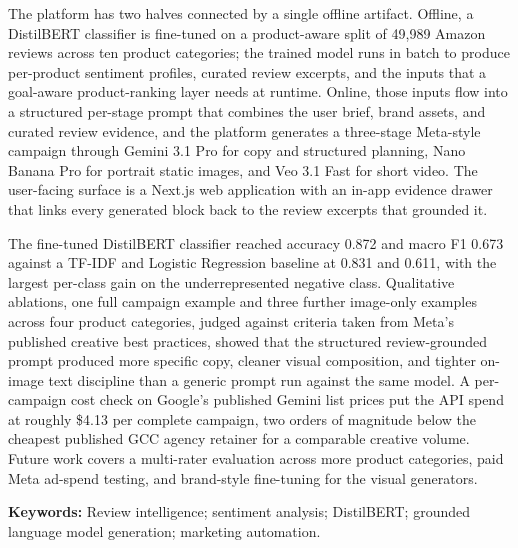 \documentclass[12pt,a4paper]{report}
\begin{document}
The platform has two halves connected by a single offline artifact. Offline, a DistilBERT classifier is fine-tuned on a product-aware split of 49,989 Amazon reviews across ten product categories; the trained model runs in batch to produce per-product sentiment profiles, curated review excerpts, and the inputs that a goal-aware product-ranking layer needs at runtime. Online, those inputs flow into a structured per-stage prompt that combines the user brief, brand assets, and curated review evidence, and the platform generates a three-stage Meta-style campaign through Gemini 3.1 Pro for copy and structured planning, Nano Banana Pro for portrait static images, and Veo 3.1 Fast for short video. The user-facing surface is a Next.js web application with an in-app evidence drawer that links every generated block back to the review excerpts that grounded it.

The fine-tuned DistilBERT classifier reached accuracy 0.872 and macro F1 0.673 against a TF-IDF and Logistic Regression baseline at 0.831 and 0.611, with the largest per-class gain on the underrepresented negative class. Qualitative ablations, one full campaign example and three further image-only examples across four product categories, judged against criteria taken from Meta's published creative best practices, showed that the structured review-grounded prompt produced more specific copy, cleaner visual composition, and tighter on-image text discipline than a generic prompt run against the same model. A per-campaign cost check on Google's published Gemini list prices put the API spend at roughly \$4.13 per complete campaign, two orders of magnitude below the cheapest published GCC agency retainer for a comparable creative volume. Future work covers a multi-rater evaluation across more product categories, paid Meta ad-spend testing, and brand-style fine-tuning for the visual generators.

\vspace{0.5cm}
\noindent\textbf{Keywords:} Review intelligence; sentiment analysis; DistilBERT; grounded language model generation; marketing automation.


\newpage
\tableofcontents

\newpage
\listoffigures

\newpage
\listoftables


\newpage
{}
\end{document}
